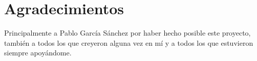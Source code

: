 %
%

\chapter*{Agradecimientos}

Principalmente a Pablo García Sánchez por haber hecho posible este proyecto, también a todos los que creyeron alguna vez en mí y a todos los que estuvieron siempre apoyándome.

